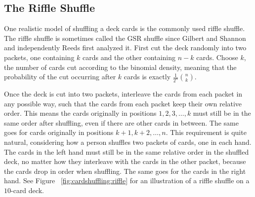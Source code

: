 \documentclass[12pt]{article}
\begin{document}
\subsection*{The Riffle Shuffle}

One realistic model of shuffling a deck cards is the commonly used 
{riffle shuffle}.%
The riffle shuffle is sometimes called the GSR shuffle since Gilbert and
Shannon and independently Reeds first analyzed it.  First cut the deck
randomly into two packets, one containing \( k \) cards and the other
containing \( n-k \) cards.  Choose \( k \), the number of cards cut
according to the binomial density, meaning that the probability of the
cut occurring after \( k \) cards is exactly \( \frac{1}{2^n}\binom{n}{k}
\).

Once the deck is cut into two packets, interleave the cards from each
packet in any possible way, such that the cards from each packet keep
their own relative order.  This means the cards originally in positions \(
1, 2, 3, \dots, k \) must still be in the same order after shuffling,
even if there are other cards in between.  The same goes for cards
originally in positions \( k+1, k+2, \dots, n \).  This requirement is
quite natural, considering how a person shuffles two packets of cards,
one in each hand.  The cards in the left hand must still be in the same
relative order in the shuffled deck, no matter how they interleave with
the cards in the other packet, because the cards drop in order when
shuffling.  The same goes for the cards in the right hand. See Figure~%
\ref{fig:cardshuffling:riffle} for an illustration of a riffle shuffle
on a \( 10 \)-card deck.
\end{document}
